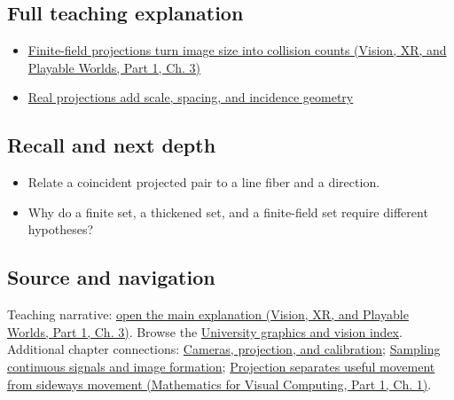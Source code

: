 \subsection{Full teaching explanation}\label{appendix-3c73f7862157-full-teaching-explanation}

\hypertarget{appendix-3c73f7862157-full-teaching-explanation}{}

\begin{itemize}
\tightlist
\item
  \href{../07-Vision-XR-and-Playable-Worlds-P01/main.pdf\#nameddest=04-visual-computing-ii-ch032-finite-field-projections-turn-image-size-into-collision-counts}{Finite-field projections turn image size into collision counts (Vision, XR, and Playable Worlds, Part 1, Ch. 3)}
\item
  \hyperref[04-visual-computing-ii-ch033-real-projections-add-scale-spacing-and-incidence-geometry]{Real projections add scale, spacing, and incidence geometry}
\end{itemize}

\subsection{Recall and next depth}\label{appendix-3c73f7862157-recall-and-next-depth}

\hypertarget{appendix-3c73f7862157-recall-and-next-depth}{}

\begin{itemize}
\tightlist
\item
  Relate a coincident projected pair to a line fiber and a direction.
\item
  Why do a finite set, a thickened set, and a finite-field set require different hypotheses?
\end{itemize}

\subsection{Source and navigation}\label{appendix-3c73f7862157-source-and-navigation}

\hypertarget{appendix-3c73f7862157-source-and-navigation}{}

Teaching narrative: \href{../07-Vision-XR-and-Playable-Worlds-P01/main.pdf\#nameddest=04-visual-computing-ii-ch032-finite-field-projections-turn-image-size-into-collision-counts}{open the main explanation (Vision, XR, and Playable Worlds, Part 1, Ch. 3)}. Browse the \hyperref[appendix-a6d556a4ef50-university-graphics-vision-and-photography---independent-series]{University graphics and vision index}. Additional chapter connections: \hyperref[03-visual-computing-i-ch003-cameras-projection-and-calibration]{Cameras, projection, and calibration}; \hyperref[03-visual-computing-i-ch003-sampling-continuous-signals-and-image-formation]{Sampling continuous signals and image formation}; \href{../02-Mathematics-for-Visual-Computing-P01/main.pdf\#nameddest=01-foundations-i-ch017-projection-separates-useful-movement-from-sideways-movement}{Projection separates useful movement from sideways movement (Mathematics for Visual Computing, Part 1, Ch. 1)}.

